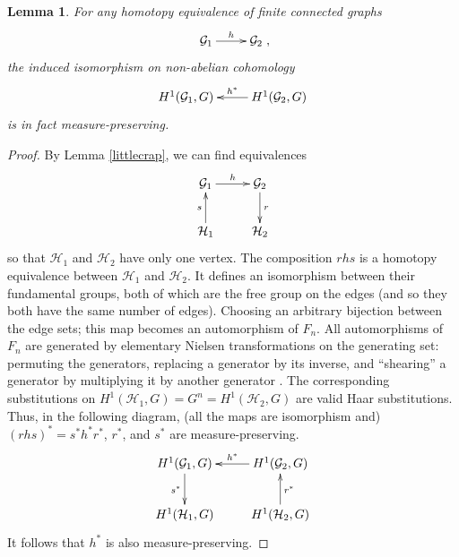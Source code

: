 \documentclass[12pt]{article}
\newtheorem{lem}[thm]{Lemma}
\newcommand{\HH}{\mathcal{H}}
\newcommand{\GG}{\mathcal{G}}
\newcommand{\be}{\begin{equation}}
\newcommand{\ee}{\end{equation}}
\begin{document}
\begin{lem}\label{measurepreserving}
For any homotopy equivalence of finite connected graphs 
\be 
\xymatrix{
\GG_1 \ar[r]^h & \GG_2
},
\ee
the induced isomorphism on non-abelian cohomology
\be 
\xymatrix{
H^1(\GG_1,G) & \ar[l]_{h^*} H^1(\GG_2,G)
}
\ee
is in fact measure-preserving.
\end{lem}
\begin{proof}
By Lemma \ref{littlecrap}, we can find equivalences
\be 
\xymatrix{
\GG_1 \ar[r]^h & \GG_2 \ar[d]^r\\
\HH_1 \ar[u]^s & \HH_2
}
\ee
so that $\HH_1$ and $\HH_2$ have only one vertex.  The composition $rhs$ is a homotopy equivalence between $\HH_1$ and $\HH_2$.  It defines an isomorphism between their fundamental groups, both of which are the free group on the edges (and so they both have the same number of edges).  Choosing an arbitrary bijection between the edge sets; this map becomes an automorphism of $F_n$.  All automorphisms of $F_n$ are generated by elementary Nielsen transformations on the generating set: permuting the generators, replacing a generator by its inverse, and ``shearing'' a generator by multiplying it by another generator \cite{nielsen, nielsenenglish}.  The corresponding substitutions on $H^1(\HH_1,G) = G^n = H^1(\HH_2,G)$ are valid Haar substitutions.  Thus, in the following diagram, (all the maps are isomorphism and) $(rhs)^* = s^*h^*r^*$, $r^*$, and $s^*$ are measure-preserving.
\be 
\xymatrix{
H^1(\GG_1,G) \ar[d]_{s^*} & H^1(\GG_2,G) \ar[l]_{h^*}\\
H^1(\HH_1,G) & H^1(\HH_2,G) \ar[u]_{r^*}
}
\ee
It follows that $h^*$ is also measure-preserving.
\end{proof}
\end{document}
